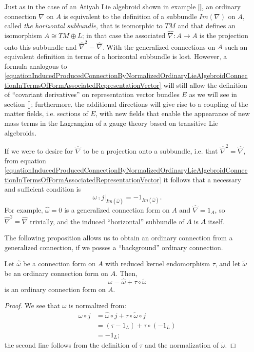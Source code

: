 \begin{remark}
Just as in the case of an Atiyah Lie algebroid shown in example \ref{}, an ordinary connection $\nabla$ on $A$ is equivalent to the definition of a subbundle $Im(\nabla)$ on $A$, called \emph{the horizontal subbundle}, that is isomorphic to $TM$ and that defines an isomorphism $A \cong TM \oplus L$; in that case the associated $\hat \nabla: A \to A$ is the projection onto this subbundle and $\hat \nabla^2 = \hat \nabla$. With the generalized connections on $A$ such an equivalent definition in terms of a horizontal subbundle is lost. However, a formula analogous to \eqref{equationInducedProducedConnectionByNormalizedOrdinaryLieAlgebroidConnectionInTermsOfFormAssociatedRepresentationVector} will still allow the definition of ``covariant derivatives'' on representation vector bundles $E$ as we will see in section \ref{}; furthermore, the additional directions will give rise to a coupling of the matter fields, i.e. sections of $E$, with new fields that enable the appearance of new mass terms in the Lagrangian of a gauge theory based on transitive Lie algebroids.

If we were to desire for $\hat \nabla$ to be a projection onto a subbundle, i.e. that $\hat \nabla^2 = \hat \nabla$, from equation \eqref{equationInducedProducedConnectionByNormalizedOrdinaryLieAlgebroidConnectionInTermsOfFormAssociatedRepresentationVector} it follows that a necessary and sufficient condition is 
\begin{equation}\label{equationEquivalentNecessarySufficientGeneralizedConnectionBeDefineHorizontalProjectionSubbundle}
    \omega \comp j|_{Im(\hat \omega)} = - 1_{Im(\hat \omega)}.
\end{equation}
For example, $\hat \omega = 0$ is a generalized connection form on $A$ and $\hat \nabla = 1_A$, so $\hat \nabla^2 = \hat \nabla$ trivially, and the induced ``horizontal'' subbundle of $A$ is $A$ itself.
\end{remark}

The following proposition allows us to obtain an ordinary connection from a generalized connection, if we posses a ``background'' ordinary connection.

\begin{proposition}
Let $\hat \omega$ be a connection form on $A$ with reduced kernel endomorphism $\tau$, and let $\tilde \omega$ be an ordinary connection form on $A$. Then,
\begin{equation}
    \omega = \hat \omega + \tau \circ \tilde \omega
\end{equation}
is an ordinary connection form on $A$.
\end{proposition}
\begin{proof}
We see that $\omega$ is normalized from:
\begin{align*}
    \omega \circ j &= \hat \omega \circ j + \tau \circ \tilde \omega \circ j\\
        &= (\tau - 1_L) + \tau \circ (-1_L) \\
        &= -1_L;
\end{align*}
the second line follows from the definition of $\tau$ and the normalization of $\tilde \omega$.
\end{proof}

\linea